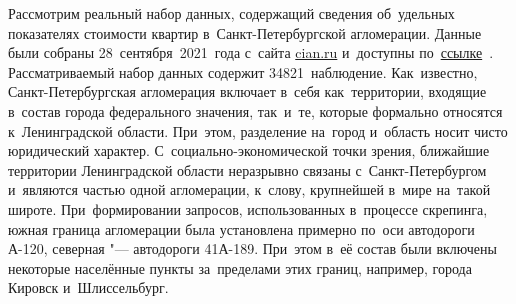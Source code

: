\documentclass[]{scrreprt}
\begin{document}
Рассмотрим реальный набор данных, содержащий сведения об~удельных показателях стоимости квартир в~Санкт-Петербургской агломерации. Данные были собраны 28~сентября~2021~года с~сайта \href{https://www.cian.ru/}{cian.ru} и~доступны по~\href{https://github.com/Kirill-Murashev/datasets/blob/main/Saint-Petersburg/flats/spba_flats_210928.csv}{ссылке}~\cite{ds:spba-flats-210928}. Рассматриваемый набор данных содержит 34821~наблюдение. Как~известно, Санкт-Петербургская агломерация включает в~себя как~территории, входящие в~состав города федерального значения, так~и~те, которые формально относятся к~Ленинградской области. При~этом, разделение на~город и~область носит чисто юридический характер. С~социально-экономической точки зрения, ближайшие территории Ленинградской области неразрывно связаны с~Санкт-Петербургом и~являются частью одной агломерации, к~слову, крупнейшей в~мире на~такой широте. При~формировании запросов, использованных в~процессе скрепинга, южная граница агломерации была установлена примерно по~оси автодороги А-120, северная "--- автодороги 41А-189. При~этом в~её состав были включены некоторые населённые пункты за~пределами этих границ, например, города Кировск и~Шлиссельбург.
\end{document}
